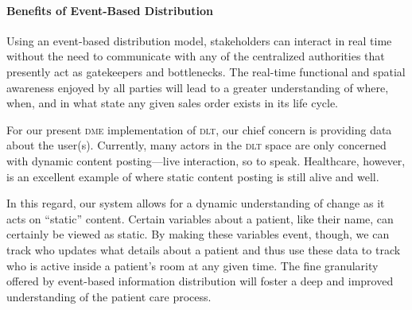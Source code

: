     \paragraph{Benefits of Event-Based Distribution}
    Using an event-based distribution model, stakeholders can interact in real time without the need to communicate with any of the centralized authorities that presently act as gatekeepers and bottlenecks. The real-time functional and spatial awareness enjoyed by all parties will lead to a greater understanding of where, when, and in what state any given sales order exists in its life cycle.%

    For our present \textsc{dme} implementation of \textsc{dlt}, our chief concern is providing data about the user(s). Currently, many actors in the \textsc{dlt} space are only concerned with dynamic content posting---live interaction, so to speak. Healthcare, however, is an excellent example of where static content posting is still alive and well.%

    In this regard, our system allows for a dynamic understanding of change as it acts on ``static'' content. Certain variables about a patient, like their name, can certainly be viewed as static. By making these variables event, though, we can track who updates what details about a patient and thus use these data to track who is active inside a patient's room at any given time. The fine granularity offered by event-based information distribution will foster a deep and improved understanding of the patient care process.%



